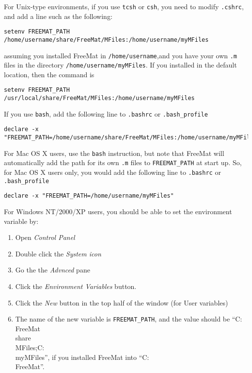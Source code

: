\documentclass{book}
\begin{document}
For Unix-type environments, if you use \verb|tcsh| or \verb|csh|, you need to modify \verb|.cshrc|, and add a line such as the following:
\begin{verbatim}
setenv FREEMAT_PATH /home/username/share/FreeMat/MFiles:/home/username/myMFiles
\end{verbatim}
assuming you installed FreeMat in \verb|/home/username|,and you have your own \verb|.m| files in the directory \verb|/home/username/myMFiles|.  If you installed in the default location, then the command is
\begin{verbatim}
setenv FREEMAT_PATH /usr/local/share/FreeMat/MFiles:/home/username/myMFiles
\end{verbatim}
If you use \verb|bash|, add the following line to \verb|.bashrc| or \verb|.bash_profile|
\begin{verbatim}
declare -x "FREEMAT_PATH=/home/username/share/FreeMat/MFiles:/home/username/myMFiles"
\end{verbatim}

For Mac OS X users, use the \verb|bash| instruction, but note that FreeMat will automatically add the path for its own \verb|.m| files to \verb|FREEMAT_PATH| at start up.  So, for Mac OS X users only, you would add the following line to \verb|.bashrc| or \verb|.bash_profile|
\begin{verbatim}
declare -x "FREEMAT_PATH=/home/username/myMFiles"
\end{verbatim}

For Windows NT/2000/XP users, you should be able to set the environment variable by:
\begin{enumerate}
\item Open \emph{Control Panel}
\item Double click the \emph{System icon}
\item Go the the \emph{Advnced} pane
\item Click the \emph{Environment Variables} button.
\item Click the \emph{New} button in the top half of the window (for User variables)
\item The name of the new variable is \verb|FREEMAT_PATH|, and the value should be ``C:\\FreeMat\\share\\MFiles;C:\\myMFiles'', if you installed FreeMat into ``C:\\FreeMat''.
\end{enumerate}
\end{document}
